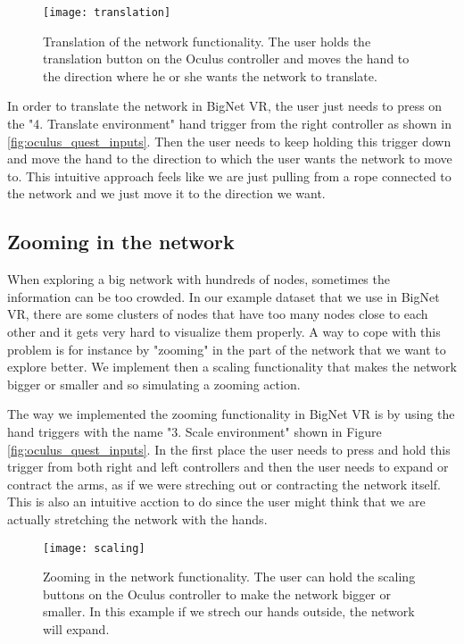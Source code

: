\begin{figure}[h!]
    \centering%
    \texttt{[image: translation]}
    \caption{Translation of the network functionality. The user holds the translation button on the Oculus controller and moves the hand to the direction where he or she wants the network to translate.}
    \label{fig:translation}
\end{figure}%

In order to translate the network in BigNet VR, the user just needs to press on the "4. Translate environment" hand trigger from the right controller as shown in \ref{fig:oculus_quest_inputs}. Then the user needs to keep holding this trigger down and move the hand to the direction to which the user wants the network to move to. This intuitive approach feels like we are just pulling from a rope connected to the network and we just move it to the direction we want.


\subsection{Zooming in the network}
When exploring a big network with hundreds of nodes, sometimes the information can be too crowded. In our example dataset that we use in BigNet VR, there are some clusters of nodes that have too many nodes close to each other and it gets very hard to visualize them properly. A way to cope with this problem is for instance by "zooming" in the part of the network that we want to explore better. We implement then a scaling functionality that makes the network bigger or smaller and so simulating a zooming action.

The way we implemented the zooming functionality in BigNet VR is by using the hand triggers with the name "3. Scale environment" shown in Figure \ref{fig:oculus_quest_inputs}. In the first place the user needs to press and hold this trigger from both right and left controllers and then the user needs to expand or contract the arms, as if we were streching out or contracting the network itself. This is also an intuitive acction to do since the user might think that we are actually stretching the network with the hands.

\begin{figure}[h!]
    \centering%
    \texttt{[image: scaling]}
    \caption{Zooming in the network functionality. The user can hold the scaling buttons on the Oculus controller to make the network bigger or smaller. In this example if we strech our hands outside, the network will expand.}
    \label{fig:scaling}
\end{figure}%


